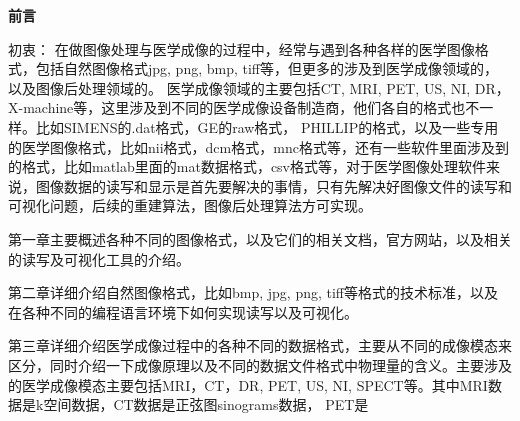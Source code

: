
\par
\centering
\textbf{前言}
\par


初衷：
在做图像处理与医学成像的过程中，经常与遇到各种各样的医学图像格式，包括自然图像格式jpg, png, bmp, tiff等，但更多的涉及到医学成像领域的，以及图像后处理领域的。
医学成像领域的主要包括CT, MRI, PET, US, NI, DR，X-machine等，这里涉及到不同的医学成像设备制造商，他们各自的格式也不一样。比如SIMENS的.dat格式，GE的raw格式， PHILLIP的格式，以及一些专用的医学图像格式，比如nii格式，dcm格式，mnc格式等，还有一些软件里面涉及到的格式，比如matlab里面的mat数据格式，csv格式等，对于医学图像处理软件来说，图像数据的读写和显示是首先要解决的事情，只有先解决好图像文件的读写和可视化问题，后续的重建算法，图像后处理算法方可实现。


第一章主要概述各种不同的图像格式，以及它们的相关文档，官方网站，以及相关的读写及可视化工具的介绍。


第二章详细介绍自然图像格式，比如bmp, jpg, png, tiff等格式的技术标准，以及在各种不同的编程语言环境下如何实现读写以及可视化。

第三章详细介绍医学成像过程中的各种不同的数据格式，主要从不同的成像模态来区分，同时介绍一下成像原理以及不同的数据文件格式中物理量的含义。主要涉及的医学成像模态主要包括MRI，CT，DR, PET, US, NI, SPECT等。其中MRI数据是k空间数据，CT数据是正弦图sinograms数据， PET是
